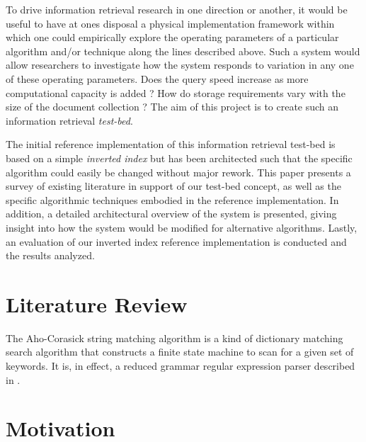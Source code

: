 \documentclass[10pt]{report}
\begin{document}
To drive information retrieval research in one direction or another,
it would be useful to have at ones disposal a physical implementation
framework within which one could empirically explore the operating
parameters of a particular algorithm and/or technique along the lines
described above. Such a system would allow researchers to investigate
how the system responds to variation in any one of these operating
parameters. Does the query speed increase as more computational
capacity is added ? How do storage requirements vary with the size of
the document collection ? The aim of this project is to create such an
information retrieval \textit{test-bed}.

The initial reference implementation of this information retrieval
test-bed is based on a simple \textit{inverted index} but has been
architected such that the specific algorithm could easily be changed
without major rework. This paper presents a survey of existing
literature in support of our test-bed concept, as well as the specific
algorithmic techniques embodied in the reference implementation. In
addition, a detailed architectural overview of the system is
presented, giving insight into how the system would be modified for
alternative algorithms. Lastly, an evaluation of our inverted index
reference implementation is conducted and the results analyzed.


\section{Literature Review}
\label{sec:literaturereview}





The Aho-Corasick string matching algorithm\cite{RefWorks:103} is a
kind of dictionary matching search algorithm that constructs a finite
state machine to scan for a given set of keywords. It is, in effect, a
reduced grammar regular expression parser described in
\cite{RefWorks:111}. 


\section{Motivation}
\label{sec:motivation}


\end{document}
